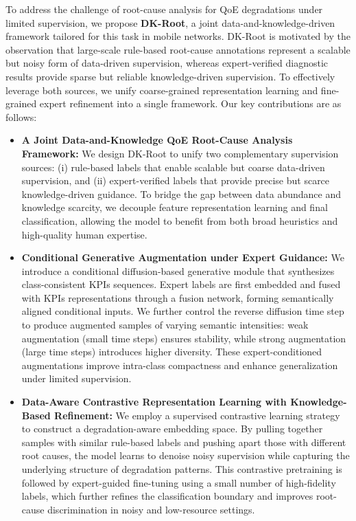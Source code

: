 \documentclass[lettersize,journal]{IEEEtran}
\begin{document}
To address the challenge of root-cause analysis for QoE degradations under limited supervision, we propose \textbf{DK-Root}, a joint data-and-knowledge-driven framework tailored for this task in mobile networks. DK-Root is motivated by the observation that large-scale rule-based root-cause annotations represent a scalable but noisy form of data-driven supervision, whereas expert-verified diagnostic results provide sparse but reliable knowledge-driven supervision. To effectively leverage both sources, we unify coarse-grained representation learning and fine-grained expert refinement into a single framework. Our key contributions are as follows:


\begin{itemize}
    \item \textbf{A Joint Data-and-Knowledge QoE Root-Cause Analysis Framework:} We design DK-Root to unify two complementary supervision sources: (i) rule-based labels that enable scalable but coarse data-driven supervision, and (ii) expert-verified labels that provide precise but scarce knowledge-driven guidance. To bridge the gap between data abundance and knowledge scarcity, we decouple feature representation learning and final classification, allowing the model to benefit from both broad heuristics and high-quality human expertise.

    \item \textbf{Conditional Generative Augmentation under Expert Guidance:} We introduce a conditional diffusion-based generative module that synthesizes class-consistent KPIs sequences. Expert labels are first embedded and fused with KPIs representations through a fusion network, forming semantically aligned conditional inputs. We further control the reverse diffusion time step to produce augmented samples of varying semantic intensities: weak augmentation (small time steps) ensures stability, while strong augmentation (large time steps) introduces higher diversity. These expert-conditioned augmentations improve intra-class compactness and enhance generalization under limited supervision.

    \item \textbf{Data-Aware Contrastive Representation Learning with Knowledge-Based Refinement:} We employ a supervised contrastive learning strategy to construct a degradation-aware embedding space. By pulling together samples with similar rule-based labels and pushing apart those with different root causes, the model learns to denoise noisy supervision while capturing the underlying structure of degradation patterns. This contrastive pretraining is followed by expert-guided fine-tuning using a small number of high-fidelity labels, which further refines the classification boundary and improves root-cause discrimination in noisy and low-resource settings.




\end{itemize}
\end{document}
